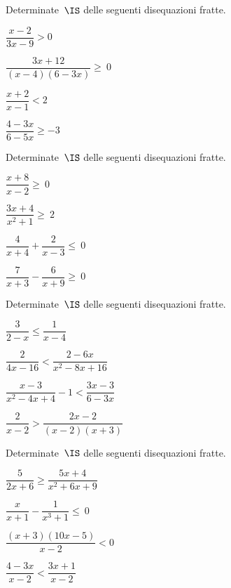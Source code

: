 \begin{esercizio}[\Ast]
\label{ese:21.55}
Determinate~$\IS$ delle seguenti disequazioni fratte.
\begin{multicols}{2}
\begin{enumeratea}
\spazielenx
\item $\dfrac{x-2}{3x-9}>0$
\item $\dfrac{3x+12}{(x-4)(6-3x)}\geqslant~0$
\item $\dfrac{x+2}{x-1}<2$
\item $\dfrac{4-3x}{6-5x}\geqslant -3$
\end{enumeratea}
\end{multicols}
\end{esercizio}

\begin{esercizio}[\Ast]
\label{ese:21.56}
Determinate~$\IS$ delle seguenti disequazioni fratte.
\begin{multicols}{2}
\begin{enumeratea}
\spazielenx
 \item $\dfrac{x+8}{x-2}\ge~0$
\item $\dfrac{3x+4}{x^{2}+1}\ge~2$
\item $\dfrac{4}{x+4}+\dfrac{2}{x-3}\leqslant~0$
\item $\dfrac{7}{x+3}-\dfrac{6}{x+9}\geqslant~0$
\end{enumeratea}
\end{multicols}
\end{esercizio}

\begin{esercizio}[\Ast]
\label{ese:21.57}
Determinate~$\IS$ delle seguenti disequazioni fratte.
\begin{multicols}{2}
\begin{enumeratea}
\spazielenx
 \item $\dfrac{3}{2-x}\leqslant \dfrac{1}{x-4}$
\item $\dfrac{2}{4x-16}<\dfrac{2-6x}{x^{2}-8x+16}$
\item $\dfrac{x-3}{x^{2}-4x+4}-1<\dfrac{3x-3}{6-3x}$
\item $\dfrac{2}{x-2}>\dfrac{2x-2}{(x-2)(x+3)}$
\end{enumeratea}
\end{multicols}
\end{esercizio}

\begin{esercizio}[\Ast]
\label{ese:21.58}
Determinate~$\IS$ delle seguenti disequazioni fratte.
\begin{multicols}{2}
\begin{enumeratea}
\spazielenx
 \item $\dfrac{5}{2x+6}\geqslant \dfrac{5x+4}{x^{2}+6x+9}$
\item $\dfrac{x}{x+1}-\dfrac{1}{x^{3}+1}\le~0$
\item $\dfrac{(x+3)(10x-5)}{x-2}<0$
\item $\dfrac{4-3x}{x-2}<\dfrac{3x+1}{x-2}$
\end{enumeratea}
\end{multicols}
\end{esercizio}

